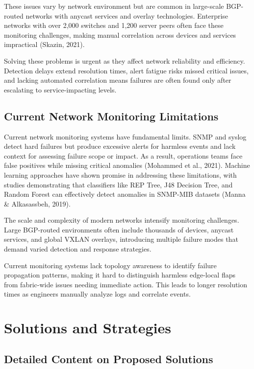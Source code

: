 \documentclass[11pt]{article}
\begin{document}
These issues vary by network environment but are common in large-scale BGP-routed networks with anycast services and overlay technologies. Enterprise networks with over 2,000 switches and 1,200 server peers often face these monitoring challenges, making manual correlation across devices and services impractical (Skazin, 2021).

Solving these problems is urgent as they affect network reliability and efficiency. Detection delays extend resolution times, alert fatigue risks missed critical issues, and lacking automated correlation means failures are often found only after escalating to service-impacting levels.

\subsection{Current Network Monitoring Limitations}

Current network monitoring systems have fundamental limits. SNMP and syslog detect hard failures but produce excessive alerts for harmless events and lack context for assessing failure scope or impact. As a result, operations teams face false positives while missing critical anomalies (Mohammed et al., 2021). Machine learning approaches have shown promise in addressing these limitations, with studies demonstrating that classifiers like REP Tree, J48 Decision Tree, and Random Forest can effectively detect anomalies in SNMP-MIB datasets (Manna \& Alkasassbeh, 2019).

The scale and complexity of modern networks intensify monitoring challenges. Large BGP-routed environments often include thousands of devices, anycast services, and global VXLAN overlays, introducing multiple failure modes that demand varied detection and response strategies.

Current monitoring systems lack topology awareness to identify failure propagation patterns, making it hard to distinguish harmless edge-local flaps from fabric-wide issues needing immediate action. This leads to longer resolution times as engineers manually analyze logs and correlate events.

\section{Solutions and Strategies}

\subsection{Detailed Content on Proposed Solutions}
\end{document}

